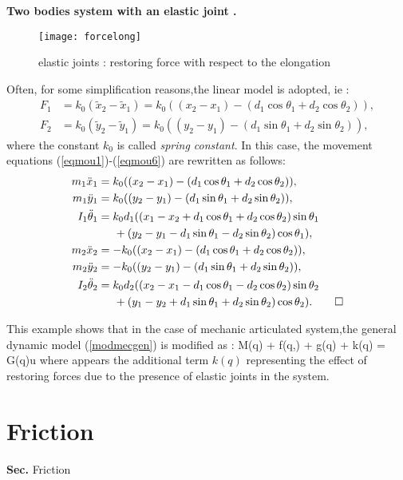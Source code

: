 \begin{exemple} {\bf Two bodies system with an elastic joint .}
\begin{figure}[ht]
\begin{center}
\texttt{[image: forcelong]}
\caption{elastic joints : restoring force with respect to the elongation }
\label{Fig:forcelong}
\end{center}
\end{figure}
Often, for some simplification reasons,the linear model is adopted, ie :
\begin{align*}
F_1 &= k_0(\tilde x_2 - \tilde x_1) = k_0((x_2 - x_1) - (d_1\cos\theta_1 + d_2\cos\theta_2)), \\
F_2 &= k_0(\tilde y_2 - \tilde y_1) = k_0((y_2 - y_1) - (d_1\sin\theta_1 + d_2\sin\theta_2)),
\end{align*}
where the constant $k_0$ is called {\em spring constant}. In this case, the movement equations  (\ref{eqmou1})-(\ref{eqmou6}) are rewritten as follows:
\begin{align*}
m_1\ddot x_1 &= k_0((x_2 - x_1) - (d_1\cos\theta_1 + d_2\cos\theta_2)), \\
m_1\ddot y_1 &= k_0((y_2 - y_1) - (d_1\sin\theta_1 + d_2\sin\theta_2)), \\
I_1\ddot \theta_1 &= k_0d_1((x_1 - x_2  + d_1\cos\theta_1 + d_2\cos\theta_2)\sin\theta_1 \\
&\hspace{5mm} +  (y_2 -y_1  - d_1\sin\theta_1 - d_2\sin\theta_2)\cos\theta_1), \\
m_2\ddot x_2 &= - k_0((x_2 - x_1) - (d_1\cos\theta_1 + d_2\cos\theta_2)), \\
m_2\ddot y_2 &= - k_0((y_2 - y_1) - (d_1\sin\theta_1 + d_2\sin\theta_2)), \\
I_2\ddot \theta_2 &=  k_0d_2((x_2 - x_1 - d_1\cos\theta_1 - d_2\cos\theta_2)\sin\theta_2 \\
&\hspace{5mm} +  (y_1 -y_2 + d_1\sin\theta_1 + d_2\sin\theta_2)\cos\theta_2). \qed
\end{align*}
\end{exemple}

This example shows that in the case of mechanic articulated system,the general dynamic model  (\ref{modmecgen}) is modified as :
\eqn
M(q) + f(q,) + g(q) + k(q) = G(q)u \label{modgenflex}
\eeqn
where appears the additional term $k(q)$ representing the effect of restoring forces due to the presence of elastic joints in the system.

\section{Friction}
{{ \bf Sec. \thesection }\hfill Friction\hspace*{5mm}} 

